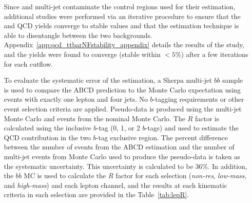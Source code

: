 Since \ttbar and  multi-jet contaminate the control
regions used for their estimation,  additional studies were
performed via an iterative procedure to ensure that the \ttbar and QCD
yields converge to stable values and that the estimation technique is
able to disentangle between the two backgrounds.
Appendix~\ref{app:qcd_ttbarNFstability_appendix} details the results of the study, and the yields 
were found to converge (stable within $<5\%$) after a few iterations for each cutflow.


To evaluate the systematic error of the estimation, a Sherpa multi-jet $bb$ sample is used to compare 
the ABCD prediction to the Monte Carlo expectation using events with exactly one lepton and four jets. 
No $b$-tagging requirements or other event selection criteria are applied. Pseudo-data is produced using
the multi-jet Monte Carlo and events from the nominal \ttbar Monte Carlo. The $R$ factor is calculated
using the inclusive $b$-tag (0, 1, or 2 $b$-tags) and used to estimate the QCD contribution in the two
$b$-tag exclusive region. The percent difference between the number of events from the ABCD estimation 
and the number of multi-jet events from Monte Carlo used to produce the pseudo-data is taken as the 
systematic uncertainty. This uncertainty is calculated to be 36\%. In addition, the $bb$ MC is used to
calculate the $R$ factor for each selection (\emph{non-res}, \emph{low-mass}, and \emph{high-mass}) and each lepton 
channel, and the results at each kinematic criteria in each selection are provided in the Table~\ref{tab:lepR}. 

